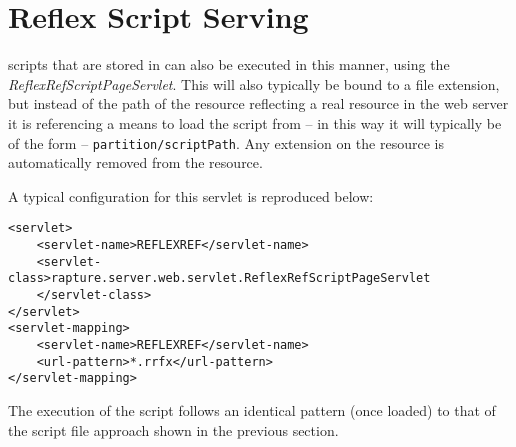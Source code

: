 \section{Reflex Script Serving}
\Reflex scripts that are stored in \Rapture can also be executed in this manner, using the \emph{ReflexRefScriptPageServlet}. This will also typically be bound to a file extension, but instead of the path of the resource reflecting a real resource in the web server it is referencing a means to load the script from \Rapture -- in this way it will typically be of the form -- \Verb+partition/scriptPath+. Any extension on the resource is automatically removed from the resource.

A typical configuration for this servlet is reproduced below:

\begin{Verbatim}
<servlet>
    <servlet-name>REFLEXREF</servlet-name>
    <servlet-class>rapture.server.web.servlet.ReflexRefScriptPageServlet
    </servlet-class>
</servlet>
<servlet-mapping>
    <servlet-name>REFLEXREF</servlet-name>
    <url-pattern>*.rrfx</url-pattern>
</servlet-mapping>
\end{Verbatim}

The execution of the script follows an identical pattern (once loaded) to that of the script file approach shown in the previous section.
